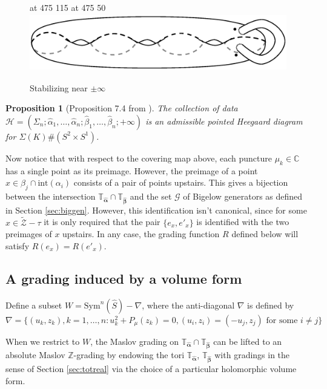 \documentclass[11pt]{article}
\theoremstyle{plain} \newtheorem{thm}{Theorem}[subsection]
\theoremstyle{plain} \newtheorem{cor}[thm]{Corollary}
\theoremstyle{plain} \newtheorem{prop}[thm]{Proposition}
\theoremstyle{plain} \newtheorem{conj}[thm]{Conjecture}
\theoremstyle{plain} \newtheorem{lem}[thm]{Lemma}
\theoremstyle{definition} \newtheorem{df}[thm]{Definition}
\theoremstyle{remark} \newtheorem{rmk}[thm]{Remark}
\theoremstyle{remark} \newtheorem{obs}[thm]{Observation}
\newcommand{\DBCs}[1]{\Sigma(#1)\#(S^{2}\times S^{1})}
\newcommand{\Ztil}{\tld{\mathcal{Z}}}
\newcommand{\G}{\mathcal{G}}
\newcommand{\h}{\mathcal{H}}
\newcommand{\tld}[1]{\widetilde{#1}}
\newcommand{\ah}{\widehat{\alpha}}
\newcommand{\bh}{\widehat{\beta}}
\newcommand{\ba}{\boldsymbol{\alpha}}
\newcommand{\bb}{\boldsymbol{\beta}}
\newcommand{\bah}{\widehat{\ba}}
\newcommand{\bbh}{\widehat{\bb}}
\newcommand{\Tah}{\mathbb{T}_{\bah}}
\newcommand{\Tbh}{\mathbb{T}_{\bbh}}
\begin{document}
\begin{figure}[h]
\centering
{} 
\small
\pinlabel* {$+\infty$} at 475 115
\pinlabel* {$-\infty$} at 475 50
\endlabellist 
\includegraphics[height = 25mm]{HandleAdd}
\caption{Stabilizing near $\pm \infty$
\label{fig:HA}}
\end{figure}
 
\begin{prop}[Proposition 7.4 from \cite{cm:R}]\label{prop:DBC}
The collection of data $\h = (\Sigma_{n}; \ah_{1}, \ldots , \ah_{n} ; \bh_{1}, \ldots , \bh_{n} ; +\infty  )$ is an admissible pointed Heegaard diagram for $\DBCs{K}$.
\end{prop}

Now notice that with respect to the covering map above, each puncture $\mu_{k} \in \mathbb{C}$ has a single point as its preimage.  However, the preimage of a point $x \in \beta_{j} \cap \text{int}(\alpha_{i})$ consists of a pair of points upstairs.  This gives a bijection between the intersection $\Tah \cap \Tbh$ and the set $\G$ of Bigelow generators as defined in Section \ref{sec:biggen}.  However, this identification isn't canonical, since for some $x \in \Ztil - \tau$ it is only required that the pair $\{ e_{x}, e'_{x} \}$ is identified with the two preimages of $x$ upstairs.  In any case, the grading function $R$ defined below will satisfy $R( e_{x}) = R( e'_{x})$.

\subsection{A grading induced by a volume form}

Define a subset $W = \text{Sym}^{n}(\widehat{S}) - \nabla$, where the anti-diagonal $\nabla$ is defined by
\begin{equation*}
\nabla = \{(u_{k} , z_{k} ), k = 1, \ldots, n : u_{k}^{2} + P_{\mu}(z_{k} ) = 0 , (u_{i} , z_{i} ) = (-u_{j} , z_{j} )\text{ for some }i\neq j \}
\end{equation*}

When we restrict to $W$, the Maslov grading on $\Tah \cap \Tbh$ can be lifted to an absolute Maslov $\mathbb{Z}$-grading by endowing the tori $\Tah$, $\Tbh$ with gradings in the sense of Section \ref{sec:totreal} via the choice of a particular holomorphic volume form.
\end{document}
